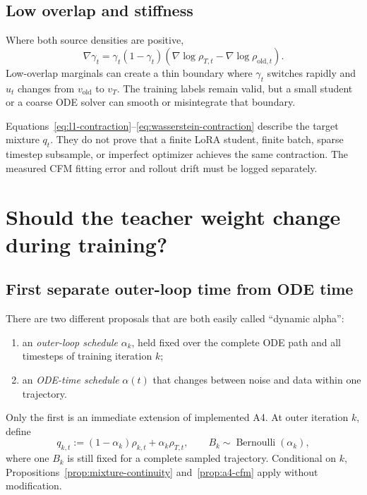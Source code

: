 \documentclass[11pt,a4paper]{article}
\newcommand{\vold}{v_{\mathrm{old}}}
\newcommand{\vT}{v_T}
\theoremstyle{plain}
\theoremstyle{definition}
\begin{document}
\subsection{Low overlap and stiffness}

Where both source densities are positive,
\begin{equation}
\nabla\gamma_t
=
\gamma_t(1-\gamma_t)
\left(
  \nabla\log\rho_{T,t}
  -\nabla\log\rho_{\mathrm{old},t}
\right).
\label{eq:gamma-gradient}
\end{equation}
Low-overlap marginals can create a thin boundary where $\gamma_t$ switches rapidly and $u_t$
changes from $\vold$ to $\vT$.  The training labels remain valid, but a small student or a coarse
ODE solver can smooth or misintegrate that boundary.

\begin{tcolorbox}[colback=red!4,colframe=red!45!black,title=Do not transfer ideal guarantees to a finite run]
Equations~\eqref{eq:l1-contraction}--\eqref{eq:wasserstein-contraction} describe the target
mixture $q_t$.  They do not prove that a finite LoRA student, finite batch, sparse timestep
subsample, or imperfect optimizer achieves the same contraction.  The measured CFM fitting error
and rollout drift must be logged separately.
\end{tcolorbox}

\section{Should the teacher weight change during training?}
\label{sec:dynamic-alpha}

\subsection{First separate outer-loop time from ODE time}

There are two different proposals that are both easily called ``dynamic alpha'':
\begin{enumerate}[leftmargin=1.6em]
\item an \emph{outer-loop schedule} $\alpha_k$, held fixed over the complete ODE path and all
      timesteps of training iteration $k$;
\item an \emph{ODE-time schedule} $\alpha(t)$ that changes between noise and data within one
      trajectory.
\end{enumerate}
Only the first is an immediate extension of implemented A4.  At outer iteration $k$, define
\begin{equation}
q_{k,t}
:=
(1-\alpha_k)\rho_{k,t}
+\alpha_k\rho_{T,t},
\qquad
B_k\sim\operatorname{Bernoulli}(\alpha_k),
\label{eq:scheduled-outer-mixture}
\end{equation}
where one $B_k$ is still fixed for a complete sampled trajectory.  Conditional on $k$,
Propositions~\ref{prop:mixture-continuity} and~\ref{prop:a4-cfm} apply without modification.
\end{document}
